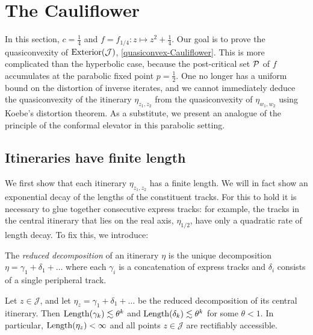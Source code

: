  

\section{The Cauliflower}
In this section, $c=\frac 14$ and $f=f_{1/4}: z\mapsto z^2+ \frac 14$.
Our goal is to prove the quasiconvexity of $\operatorname{Exterior}(\mathcal{J})$, \cref{quasiconvex-Cauliflower}. 
This is more complicated than the hyperbolic case, 
because the post-critical set $\operatorname{\mathcal P}$ of $f$ accumulates at the parabolic fixed point $p=\frac 12$. 
One no longer has a uniform bound on the distortion of inverse iterates, 
and we cannot immediately deduce the quasiconvexity of the itinerary $\eta_{z_1,z_2}$ from the quasiconvexity of $\eta_{w_1,w_2}$ using Koebe's distortion theorem. 
As a substitute, we present an analogue of the principle of the conformal elevator in this parabolic setting.

\subsection{Itineraries have finite length}
\label{sec:finite-length}

We first show that each itinerary $\eta_{z_1,z_2}$ has a finite length. 
We will in fact show an exponential decay of the lengths of the constituent tracks. 
For this to hold it is necessary to glue together consecutive express tracks: 
for example, the tracks in the central itinerary that lies on the real axis, $\eta_{1/2}$, 
have only a quadratic rate of length decay. To fix this, we introduce:

\begin{definition}
	The \emph{reduced decomposition} of an itinerary $\eta$ is the unique decomposition $\eta=\gamma_1 + \delta_1 + \dots$ where each $\gamma_i$ is a concatenation of express tracks and $\delta_i$ consists of a single peripheral track.
\end{definition}

\begin{proposition} \label{prop:finite-length}
	Let $z \in \mathcal J$, and let $\eta_z= \gamma_1 + \delta_1 + \dots  $ be the reduced decomposition of its central itinerary. Then $\operatorname{Length}(\gamma_k)\lesssim \theta^k$ and $\operatorname{Length}(\delta_k)\lesssim \theta^k$ for some $\theta < 1$. In particular, $\operatorname{Length}(\eta_z)<\infty$ and all points $z\mathcal \in \mathcal J$ are rectifiably accessible.
\end{proposition}

